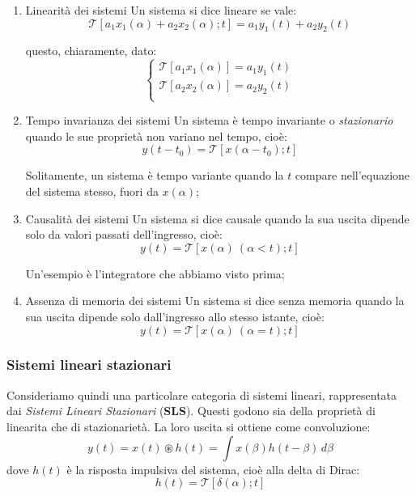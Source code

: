 \documentclass[a4paper,11pt]{article}
\begin{document}
\begin{enumerate}
	\item \begin{theorem}{Linearità dei sistemi}
		Un sistema si dice lineare se vale:
		$$
		\mathcal{T} \left[ a_1 x_1(\alpha) + a_2 x_2(\alpha); t \right] = a_1 y_1(t) + a_2 y_2(t)
		$$
	\end{theorem}
	questo, chiaramente, dato:
	$$
	\begin{cases}
		\mathcal{T} \left[ a_1 x_1(\alpha) \right] = a_1 y_1(t) \\
		\mathcal{T} \left[ a_2 x_2(\alpha) \right] = a_2 y_2(t) \\
	\end{cases}
	$$
	\item \begin{theorem}{Tempo invarianza dei sistemi}
		Un sistema è tempo invariante o \textit{stazionario} quando le sue proprietà non variano nel tempo, cioè:
		$$
		y(t - t_0) = \mathcal{T} \left[ x(\alpha - t_0); t \right]
		$$
	\end{theorem}
	Solitamente, un sistema è tempo variante quando la $t$ compare nell'equazione del sistema stesso, fuori da $x(\alpha)$;
	\item \begin{theorem}{Causalità dei sistemi}
		Un sistema si dice causale quando la sua uscita dipende solo da valori passati dell'ingresso, cioè: 
		$$
		y(t) = \mathcal{T} \left[ x(\alpha) \ (\alpha < t); t \right]
		$$
	\end{theorem}
	Un'esempio è l'integratore che abbiamo visto prima;
	\item \begin{theorem}{Assenza di memoria dei sistemi}
		Un sistema si dice senza memoria quando la sua uscita dipende solo dall'ingresso allo stesso istante, cioè: 
		$$
		y(t) = \mathcal{T} \left[ x(\alpha) \ (\alpha = t); t \right]
		$$
	\end{theorem}
\end{enumerate}

\subsubsection{Sistemi lineari stazionari}
Consideriamo quindi una particolare categoria di sistemi lineari, rappresentata dai \textit{Sistemi Lineari Stazionari} (\textbf{SLS}). Questi godono sia della proprietà di linearita che di stazionarietà. La loro uscita si ottiene come convoluzione:
$$
y(t) = x(t) \circledast h(t) = \int x(\beta) h(t - \beta) \, d\beta
$$
dove $h(t)$ è la risposta impulsiva del sistema, cioè alla delta di Dirac:
$$
h(t) = \mathcal{T} \left[ \delta(\alpha); t \right]
$$
\end{document}
